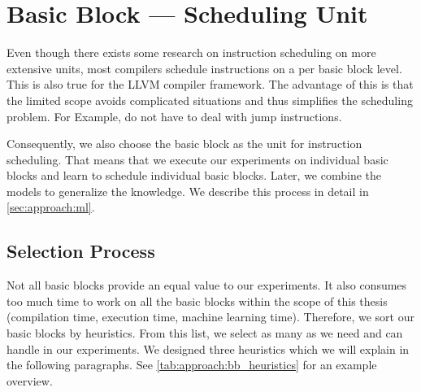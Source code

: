 \section{Basic Block --- Scheduling Unit}
\label{sec:approach:basicblock}
Even though there exists some research on instruction scheduling on more extensive units, most compilers schedule instructions on a per basic block level.
This is also true for the LLVM compiler framework.
The advantage of this is that the limited scope avoids complicated situations and thus simplifies the scheduling problem.
For Example, do not have to deal with jump instructions.

Consequently, we also choose the basic block as the unit for instruction scheduling.
That means that we execute our experiments on individual basic blocks and learn to schedule individual basic blocks.
Later, we combine the models to generalize the knowledge.
We describe this process in detail in \cref{sec:approach:ml}.

\subsection{Selection Process}
\label{sec:approach:basicblock:selection}
Not all basic blocks provide an equal value to our experiments.
It also consumes too much time to work on all the basic blocks within the scope of this thesis (\eg compilation time, execution time, machine learning time).
Therefore, we sort our basic blocks by heuristics. 
From this list, we select as many as we need and can handle in our experiments.
We designed three heuristics which we will explain in the following paragraphs.
See \cref{tab:approach:bb_heuristics} for an example overview.

